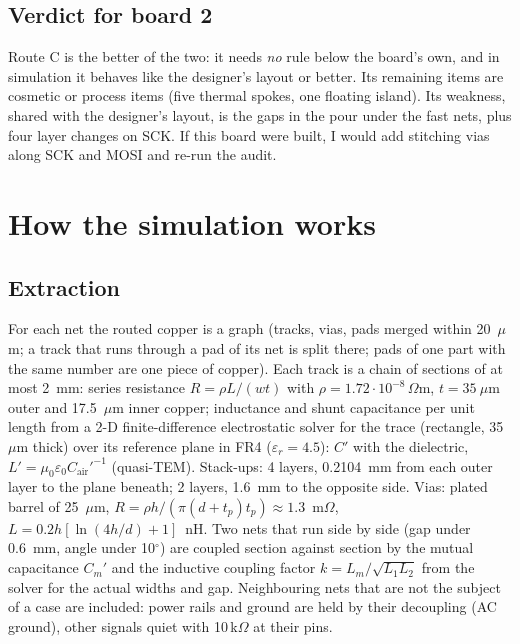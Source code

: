 \documentclass[10pt,a4paper]{article}
\begin{document}
\subsection{Verdict for board 2}

Route C is the better of the two: it needs \emph{no} rule below the board's own, and in simulation it behaves like the designer's layout or better. Its remaining items are cosmetic or process items (five thermal spokes, one floating island). Its weakness, shared with the designer's layout, is the gaps in the pour under the fast nets, plus four layer changes on SCK. If this
board were built, I would add stitching vias along SCK and MOSI and re-run the audit.

\section{How the simulation works}\label{sec:sim}

\subsection{Extraction}

For each net the routed copper is a graph (tracks, vias, pads merged within 20~$\mu$m; a track that runs through a pad of its net is split there; pads of one part with the same number are one piece of copper). Each track is a chain of sections of at most 2~mm:
series resistance $R=\rho L/(wt)$ with $\rho=1.72\cdot10^{-8}\,\Omega$m, $t=35~\mu$m outer and 17.5~$\mu$m inner copper; inductance and shunt capacitance per unit length from a 2-D finite-difference electrostatic solver for the trace
(rectangle, 35~$\mu$m thick) over its reference plane in FR4 ($\varepsilon_r=4.5$): $C'$ with the dielectric, $L'=\mu_0\varepsilon_0C_{\text{air}}'^{-1}$ (quasi-TEM). Stack-ups: 4 layers, 0.2104~mm from each outer layer to the plane beneath; 2 layers, 1.6~mm to the opposite
side. Vias: plated barrel of 25~$\mu$m, $R=\rho h/(\pi(d+t_p)t_p)\approx1.3$~m$\Omega$, $L=0.2h[\ln(4h/d)+1]$~nH. Two nets that run side by side (gap under 0.6~mm, angle under 10$^\circ$) are coupled section against section by the mutual capacitance
$C_m'$ and the inductive coupling factor $k=L_m/\sqrt{L_1L_2}$ from the solver for the actual widths and gap. Neighbouring nets that are not the subject of a case are included: power rails and ground are held by their decoupling (AC ground), other signals quiet with 10\,k$\Omega$ at their pins.
\end{document}

